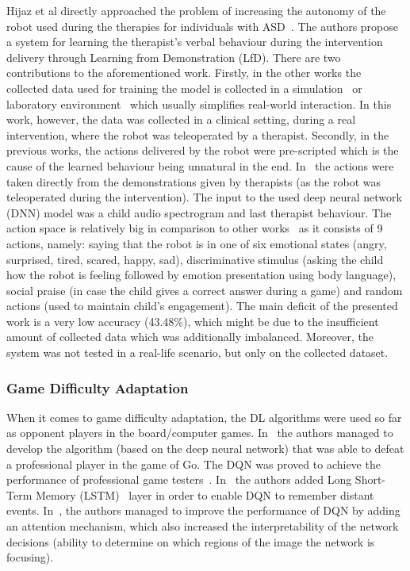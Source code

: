 \documentclass[thesis]{mas_proposal}
\begin{document}
Hijaz et al directly approached the problem of increasing the autonomy of the robot used during the therapies for individuals with ASD~\cite{Hijaz2021}. The authors propose a system for learning the therapist's verbal behaviour during the intervention delivery through Learning from Demonstration (LfD). There are two contributions to the aforementioned work. Firstly, in the other works the collected data used for training the model is collected in a simulation~\cite{Turner2018,Belo2021,Belo2022} or laboratory environment~\cite{ClarkTurner2017,Turner2018,Romeo2018} which usually simplifies real-world interaction. In this work, however, the data was collected in a clinical setting, during a real intervention, where the robot was teleoperated by a therapist. Secondly, in the previous works, the actions delivered by the robot were pre-scripted which is the cause of the learned behaviour being unnatural in the end. In~\cite{Hijaz2021} the actions were taken directly from the demonstrations given by therapists (as the robot was teleoperated during the intervention). The input to the used deep neural network (DNN) model was a child audio spectrogram and last therapist behaviour. The action space is relatively big in comparison to other works~\cite{Qureshi2016,Qureshi2017,Qureshi2018,ClarkTurner2017,Turner2018,Belo2021,Belo2022,Romeo2018,Romeo2019} as it consists of 9 actions, namely: saying that the robot is in one of six emotional states (angry, surprised, tired, scared, happy, sad), discriminative stimulus (asking the child how the robot is feeling followed by emotion presentation using body language), social praise (in case the child gives a correct answer during a game) and random actions (used to maintain child's engagement). The main deficit of the presented work is a very low accuracy (43.48\%), which might be due to the insufficient amount of collected data which was additionally imbalanced. Moreover, the system was not tested in a real-life scenario, but only on the collected dataset. 

\subsubsection{Game Difficulty Adaptation}
When it comes to game difficulty adaptation, the DL algorithms were used so far as opponent players in the board/computer games. In~\cite{Silver2016} the authors managed to develop the algorithm (based on the deep neural network) that was able to defeat a professional player in the game of Go. The DQN was proved to achieve the performance of professional game testers~\cite{mnih2015human}. In~\cite{hausknecht2015deep} the authors added Long Short-Term Memory (LSTM)~\cite{hochreiter1997long} layer in order to enable DQN to remember distant events. In~\cite{sorokin2015deep}, the authors managed to improve the performance of DQN by adding an attention mechanism, which also increased the interpretability of the network decisions (ability to determine on which regions of the image the network is focusing). 
\end{document}
